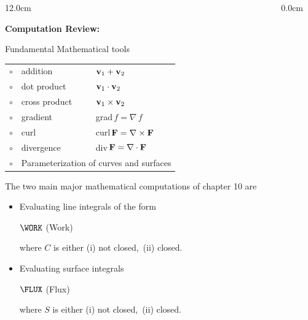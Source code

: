 \begin{frame}
\frametitle{}
\scriptsize
\begin{columns}
\begin{column}{12.0cm}

{\bf Computation Review:}

\vspace{0.2cm}

Fundamental Mathematical tools

\vspace{0.2cm}

\begin{tabular}{cll}
	$\circ$ & addition & ${\bf v}_1 + {\bf v}_2$\\
	$\circ$ & dot product & ${\bf v}_1 \cdot {\bf v}_2$\\
	$\circ$ & cross product & ${\bf v}_1 \times {\bf v}_2$\\
	$\circ$ & gradient & grad\,$f = \nabla\,f$\\
	$\circ$ & curl & curl\,${\bf F} = \nabla \times {\bf F}$\\
	$\circ$ & divergence & div\,${\bf F} = \nabla \cdot {\bf F}$\\
	$\circ$ & \multicolumn{2}{c}{Parameterization of curves and surfaces} \\
\end{tabular}
	
\vspace{0.3cm}

The two main major mathematical computations of chapter 10 are

\vspace{0.2cm}

\begin{itemize}
	\item Evaluating line integrals of the form
	\begin{center}
		$\WORK$ \hspace{1.0cm} (Work)
	\end{center}
	where $C$ is either (i) not closed, \,(ii) closed.
	\vspace{0.4cm}
	\item Evaluating surface integrals
	\begin{center}
		$\FLUX$ \hspace{1.0cm} (Flux)
	\end{center}
	where $S$ is either (i) not closed, \,(ii) closed.
\end{itemize}

\vspace{0.2cm}

\end{column}
\begin{column}{0.0cm}\end{column}
\end{columns}
\end{frame}

